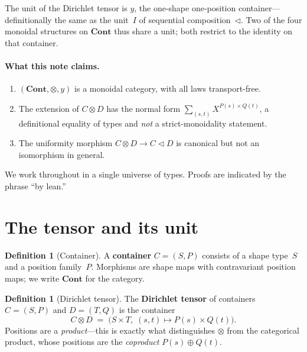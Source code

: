 \documentclass[11pt,a4paper]{article}
\theoremstyle{plain}
\theoremstyle{definition}
\newtheorem{definition}[theorem]{Definition}
\newcommand{\Cont}{\mathbf{Cont}}
\newcommand{\seq}{\mathbin{\triangleleft}}
\newcommand{\Dir}{\mathbin{\otimes}}
\begin{document}
The unit of the Dirichlet tensor is $y$, the one-shape one-position
container---definitionally the same as the unit~$I$ of sequential
composition~$\seq$. Two of the four monoidal structures on $\Cont$ thus
share a unit; both restrict to the identity on that container.

\paragraph{What this note claims.}
\begin{enumerate}
  \item $(\Cont, \Dir, y)$ is a monoidal category, with all laws
        transport-free.
  \item The extension of $C \Dir D$ has the normal form
        $\sum_{(s,t)} X^{P(s)\times Q(t)}$, a definitional equality of
        types and \emph{not} a strict-monoidality statement.
  \item The uniformity morphism $C \Dir D \to C \seq D$ is canonical but
        not an isomorphism in general.
\end{enumerate}

We work throughout in a single universe of types. Proofs are indicated by
the phrase ``by lean.''

\section{The tensor and its unit}

\begin{definition}[Container]\label{def:container}
A \textbf{container} $C = (S,P)$ consists of a shape type~$S$ and a
position family~$P$. Morphisms are shape maps with contravariant position
maps; we write $\Cont$ for the category.
\end{definition}

\begin{definition}[Dirichlet tensor]\label{def:dirichlet}
The \textbf{Dirichlet tensor} of containers $C = (S,P)$ and $D = (T,Q)$
is the container
\begin{equation}
  C \Dir D
  \;=\;
  \bigl(
    S \times T,\;
    (s,t) \mapsto P(s) \times Q(t)
  \bigr).
\end{equation}
Positions are a \emph{product}---this is exactly what distinguishes
$\Dir$ from the categorical product, whose positions are the
\emph{coproduct} $P(s) \oplus Q(t)$.
\end{definition}
\end{document}
